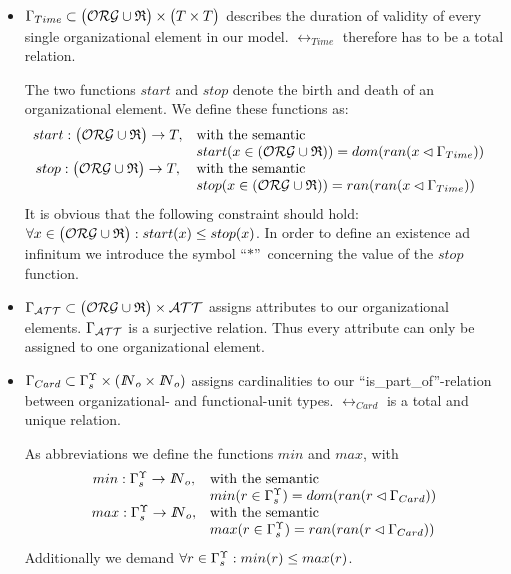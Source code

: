 	\begin{itemize}
	\item $\Gamma_{Time} \subset \bigl( \mathcal{ORG} \cup \mathfrak{R} \bigr)\times \bigl( T \times T \bigr)$ describes the duration of validity of every single organizational element in our model. $\rel_{Time}$ therefore has to be a total relation.

The two functions $start$ and $stop$ denote the birth and death of an organizational element. We define these functions as:
			$$
			\begin{array}{cll}
			start: \bigl( \mathcal{ORG} \cup \mathfrak{R} \bigr) \rightarrow T, &
				\mbox{with the semantic} & \\
				& start(x \in ( \mathcal{ORG} \cup \mathfrak{R} ) ) =
				dom( ran ( x \lhd \Gamma_{Time})) & \\
			stop: \bigl( \mathcal{ORG} \cup \mathfrak{R} \bigr) \rightarrow T, &
				\mbox{with the semantic} & \\
				& stop(x \in ( \mathcal{ORG} \cup \mathfrak{R} ) ) =
				ran( ran ( x \lhd \Gamma_{Time})) & \\
			\end{array}
			$$
It is obvious that the following constraint should hold: $\forall x \in \bigl( \mathcal{ORG} \cup \mathfrak{R} \bigr): start(x) \leq stop(x)$.  In order to define an existence ad infinitum we introduce the symbol ``$*$''\ concerning the value of the $stop$ function.

	\item $\Gamma_{\mathcal{ATT}} \subset \bigl( \mathcal{ORG} \cup \mathfrak{R} \bigr) \times \mathcal{ATT}$ assigns attributes to our organizational elements.
		$\Gamma_{\mathcal{ATT}}$ is a surjective relation. Thus every attribute can only be assigned to one organizational element.

	\item $\Gamma_{Card} \subset {\Gamma}^{\Upsilon}_{s} \times ({ I\!\!N}_{o} \times { I\!\!N}_{o})$ assigns cardinalities to our ``is\_part\_of''-relation between organizational- and functional-unit types. $\rel_{Card}$ is a total and unique relation.

		As abbreviations we define the functions $min$ and $max$, with
		$$
		\begin{array}{cl}
		min: {\Gamma}^{\Upsilon}_{s} \rightarrow { I\!\!N}_{o}, & \mbox{with the semantic} \\
		& min(r \in {\Gamma}^{\Upsilon}_{s}) = dom( ran( r \lhd \Gamma_{Card})) \\
		max: {\Gamma}^{\Upsilon}_{s} \rightarrow { I\!\!N}_{o}, & \mbox{with the semantic} \\
		& max(r \in {\Gamma}^{\Upsilon}_{s}) = ran( ran ( r \lhd \Gamma_{Card}))
		\end{array}
		$$
		Additionally we demand $\forall r \in {\Gamma}^{\Upsilon}_{s}: min(r) \leq max(r)$.


\end{itemize}
